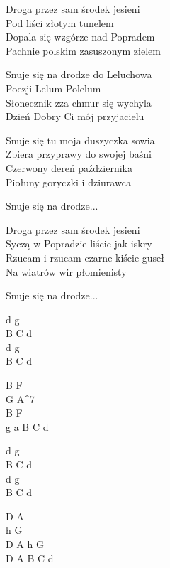 \begin{text}
    Droga przez sam środek jesieni\\
    Pod liści złotym tunelem\\
    Dopala się wzgórze nad Popradem\\
    Pachnie polskim zasuszonym zielem

    \vin Snuje się na drodze do Leluchowa\\
    \vin Poezji Lelum-Polelum\\
    \vin Słonecznik zza chmur się wychyla\\
    \vin Dzień Dobry Ci mój przyjacielu

    Snuje się tu moja duszyczka sowia\\
    Zbiera przyprawy do swojej baśni\\
    Czerwony dereń października\\
    Piołuny goryczki i dziurawca
	
	\vin Snuje się na drodze...

    Droga przez sam środek jesieni\\
    Syczą w Popradzie liście jak iskry\\
    Rzucam i rzucam czarne kiście guseł\\
    Na wiatrów wir płomienisty
	
	\vin Snuje się na drodze...
\end{text}
\begin{chord}
    d g\\
    B C d\\
    d g\\
    B C d

    B F\\
    G A^7\\
    B F\\
    g a B C d

    d g\\
    B C d\\
    d g\\
    B C d
	
	\hfill\break
	\hfill\break
    D A\\
    h G\\
    D A h G\\
    D A B C d
\end{chord}